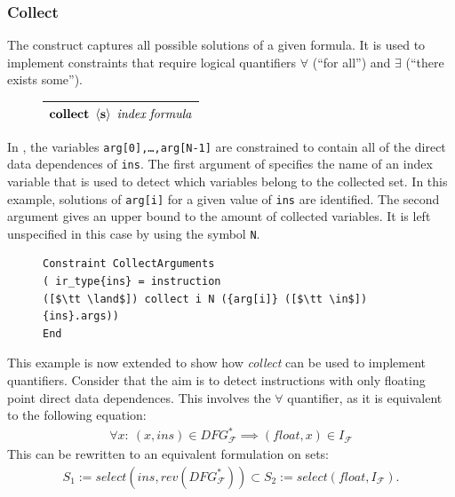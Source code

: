 \begin{figure}[h]

\end{figure}

\subsubsection{Collect}

    The  construct captures all possible solutions of a given
    formula.
    It is used to implement constraints that require logical quantifiers
    $\forall$ (``for all'') and $\exists$ (``there exists some'').
\begin{figure}[H]
    \centering
    \begin{tabular}{|c|}
        \hline
        $\text{\bf collect}\ \left<\text{\bf s}\right>\ \text{\it index}\ \text{\it formula}$\\
        \hline
    \end{tabular}
\end{figure}

    \noindent
    In , the variables \texttt{arg[0],\dots,arg[N-1]}
    are constrained to contain all of the direct data dependences of
    \texttt{ins}.
    The first argument of  specifies the name of an index
    variable that is used to detect which variables belong to the collected set.
    In this example, solutions of \texttt{arg[i]} for a given value
    of \texttt{ins} are identified.
    The second argument gives an upper bound to the amount of collected
    variables.
    It is left unspecified in this case by using the symbol \texttt{N}.

\begin{figure}[t]
\begin{lstlisting}[language=CAnDL,label={fig:simplecollect},caption=
   {Simple {\it collect} example in CAnDL: All direct data dependences of
    {\tt ins} are collected.\leftskip=0pt\rightskip=0pt}]
Constraint CollectArguments
( ir_type{ins} = instruction
([$\tt \land$]) collect i N ({arg[i]} ([$\tt \in$]) {ins}.args))
End
\end{lstlisting}
\end{figure}

    This example is now extended to show how {\it collect} can be used to
    implement quantifiers.
    Consider that the aim is to detect instructions with only floating point
    direct data dependences.
    This involves the $\forall$ quantifier, as it is equivalent to
    the following equation:
    \begin{align}
        \forall x\colon\ (x,ins)\in DFG_\mathcal F^*\implies(float,x)\in I_\mathcal F
        \label{fig:implication}
    \end{align}
    This can be rewritten to an equivalent formulation on sets:
    \begin{align*}
        S_1:= select(ins,rev(DFG_\mathcal F^*))\subset S_2:=select(float,I_\mathcal F).
    \end{align*}

